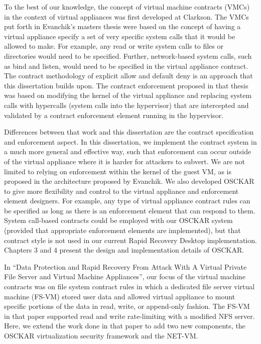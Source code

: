 To the best of our knowledge, the concept of virtual machine contracts (VMCs) in the context of virtual appliances was first developed at Clarkson. The VMCs put forth in Evanchik's masters thesis\cite{evanchik_thesis_2004} were based on the concept of having a virtual appliance specify a set of very specific system calls that it would be allowed to make. For example, any read or write system calls to files or directories would need to be specified. Further, network-based system calls, such as bind and listen, would need to be specified in the virtual appliance contract. The contract methodology of explicit allow and default deny is an approach that this dissertation builds upon. The contract enforcement proposed in that thesis was based on modifying the kernel of the virtual appliance and replacing system calls with hypercalls (system calls into the hypervisor) that are intercepted and validated by a contract enforcement element running in the hypervisor. 

Differences between that work and this dissertation are the contract specification and enforcement aspect. In this dissertation, we implement the contract system in a much more general and effective way, such that enforcement can occur outside of the virtual appliance where it is harder for attackers to subvert. We are not limited to relying on enforcement within the kernel of the guest VM, as is proposed in the architecture proposed by Evanchik\cite{evanchik_thesis_2004}. We also developed OSCKAR to give more flexibility and control to the virtual appliance and enforcement element designers. For example, any type of virtual appliance contract rules can be specified as long as there is an enforcement element that can respond to them. System call-based contracts could be employed with our OSCKAR system (provided that appropriate enforcement elements are implemented), but that contract style is not used in our current Rapid Recovery Desktop implementation. Chapters 3 and 4 present the design and implementation details of OSCKAR.

In ``Data Protection and Rapid Recovery From Attack With A Virtual Private File Server and Virtual Machine Appliances''\cite{rapid_recovery_paper_05}, our focus of the virtual machine contracts was on file system contract rules in which a dedicated file server virtual machine (FS-VM) stored user data and allowed virtual appliance to mount specific portions of the data in read, write, or append-only fashion. The FS-VM in that paper supported read and write rate-limiting with a modified NFS server. Here, we extend the work done in that paper to add two new components, the OSCKAR virtualization security framework and the NET-VM.

